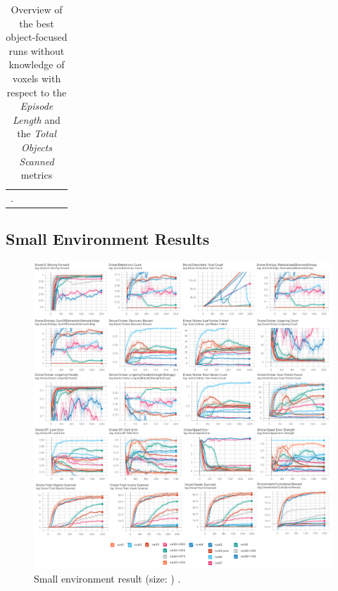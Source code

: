 \begin{table}
\begin{longtable}{|l|c|c|c|c|c|}
    \caption{Overview of the best object-focused runs without knowledge of voxels with respect to the \textit{Episode Length} and the \textit{Total Objects Scanned} metrics}. \label{tab:RQ1-results-noknowledgeofvoxels}
\end{longtable}

\end{table}



\subsection{Small Environment Results}
\begin{figure}[!ht]
        \centering
        \includegraphics[width=1\textwidth]{images/results_baseAgent.png}
        \caption{Small environment result (size: ) .
        }
        \label{fig:results-small-env-performances}
\end{figure}

